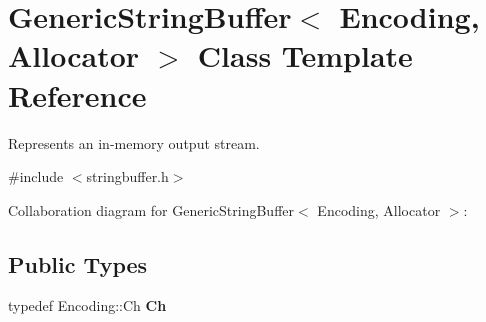 \hypertarget{class_generic_string_buffer}{}\section{Generic\+String\+Buffer$<$ Encoding, Allocator $>$ Class Template Reference}
\label{class_generic_string_buffer}


Represents an in-\/memory output stream.  




{\ttfamily \#include $<$stringbuffer.\+h$>$}



Collaboration diagram for Generic\+String\+Buffer$<$ Encoding, Allocator $>$\+:
\subsection*{Public Types}
\begin{DoxyCompactItemize}
\item 
\mbox{\label{class_generic_string_buffer_a735b75db076ffe86d0d294be49655d46}} 
typedef Encoding\+::\+Ch {\bfseries Ch}
\end{DoxyCompactItemize}
